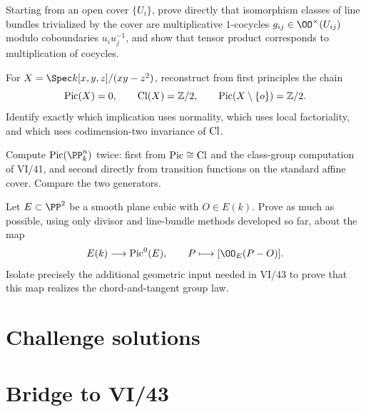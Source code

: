 \begin{problem}\label{chal:vi42-02}
Starting from an open cover \(\{U_i\}\), prove directly that isomorphism classes of line bundles trivialized by the cover are multiplicative \(1\)-cocycles \(g_{ij}\in\OO^\times(U_{ij})\) modulo coboundaries \(u_i u_j^{-1}\), and show that tensor product corresponds to multiplication of cocycles.
\end{problem}

\begin{problem}\label{chal:vi42-03}
For \(X=\Spec k[x,y,z]/(xy-z^2)\), reconstruct from first principles the chain
\[
  \operatorname{Pic}(X)=0,\qquad
  \operatorname{Cl}(X)=\mathbb Z/2,\qquad
  \operatorname{Pic}(X\setminus\{o\})=\mathbb Z/2.
\]
Identify exactly which implication uses normality, which uses local factoriality, and which uses codimension-two invariance of \(\operatorname{Cl}\).
\end{problem}

\begin{problem}\label{chal:vi42-04}
Compute \(\Pic(\PP^n_k)\) twice: first from \(\operatorname{Pic}\cong\operatorname{Cl}\) and the class-group computation of VI/41, and second directly from transition functions on the standard affine cover.  Compare the two generators.
\end{problem}

\begin{problem}\label{chal:vi42-05}
Let \(E\subset\PP^2\) be a smooth plane cubic with \(O\in E(k)\).  Prove as much as possible, using only divisor and line-bundle methods developed so far, about the map
\[
  E(k)\longrightarrow\Pic^0(E),
  \qquad
  P\longmapsto[\OO_E(P-O)].
\]
Isolate precisely the additional geometric input needed in VI/43 to prove that this map realizes the chord-and-tangent group law.
\end{problem}

\ifdefined\IncludeChallengeSolutions
\section{Challenge solutions}

\fi

\section*{Bridge to VI/43}

